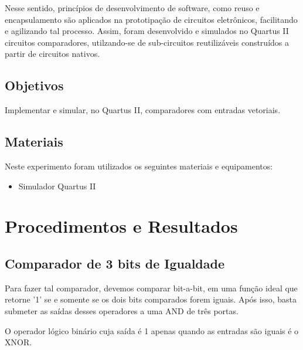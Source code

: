 \documentclass[12pt]{article}
\begin{document}
\noindent Nesse sentido, princípios de desenvolvimento de
software, como reuso e encapsulamento são aplicados na prototipação
de circuitos eletrônicos, facilitando e agilizando tal processo. Assim,
foram desenvolvido e simulados no Quartus II circuitos comparadores, utilzando-se
de sub-circuitos reutilizáveis construídos a partir de circuitos nativos.

\subsection{Objetivos}
\label{sec:Objetivos}

Implementar e simular, no Quartus II, comparadores com entradas vetoriais.

\subsection{Materiais} 
\label{sec:Materiais}
Neste experimento foram utilizados os seguintes materiais e equipamentos:
\begin{itemize}
    \item Simulador Quartus II

\end{itemize}

\section{Procedimentos e Resultados}
\label{sec:Procedimentos}

\subsection{Comparador de 3 bits de Igualdade}
\label{sec:Mux}

Para fazer tal comparador, devemos comparar bit-a-bit,
em uma função ideal que retorne '1' se e somente se
os dois bits
comparados forem iguais. Após isso, basta submeter as saídas
desses operadores a uma AND de três portas.

O operador lógico binário cuja saída é 1 apenas quando
as entradas são iguais é o XNOR\cite{wakerly90}.
\end{document}
